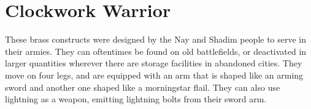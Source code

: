 \section{Clockwork Warrior}

These brass constructs were designed by the Nay and Shadim people to serve in their armies. They can oftentimes be found on old battlefields, or deactivated in larger quantities wherever there are storage facilities in abandoned cities. They move on four legs, and are equipped with an arm that is shaped like an arming sword and another one shaped like a morningstar flail. They can also use lightning as a weapon, emitting lightning bolts from their sword arm.